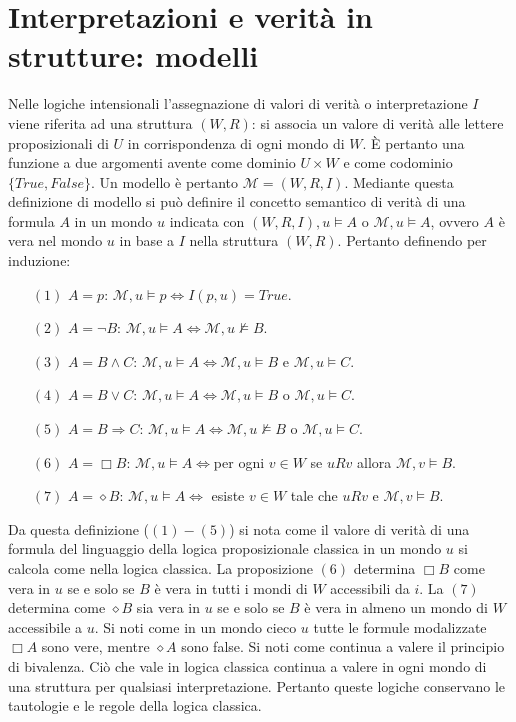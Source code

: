 \section{Interpretazioni e verit\`a in strutture: modelli}
Nelle logiche intensionali l'assegnazione di valori di verit\`a o interpretazione $I$ viene riferita ad una struttura $(W, R)$: si associa un valore di verit\`a alle lettere proposizionali di $U$ in corrispondenza di 
ogni mondo di $W$. \`E pertanto una funzione a due argomenti avente come dominio $U\times W$ e come codominio $\{True, False\}$. Un modello \`e pertanto $\mathcal{M}=(W, R, I)$. Mediante questa 
definizione di modello si pu\`o definire il concetto semantico di verit\`a di una formula $A$ in un mondo $u$ indicata con $(W, R, I), u\models A$ o $\mathcal{M}, u\models A$, ovvero $A$ \`e vera nel mondo 
$u$ in base a $I$ nella struttura $(W, R)$. Pertanto definendo per induzione: 
\begin{itemize}
\item[$(1)$] $A=p$: $\mathcal{M}, u\models p\Leftrightarrow I(p, u)=True$.
\item[$(2)$] $A=\neg B$: $\mathcal{M}, u\models A\Leftrightarrow \mathcal{M}, u\not\models B$.
\item[$(3)$] $A=B\land C$: $\mathcal{M}, u\models A\Leftrightarrow \mathcal{M}, u\models B$ e $\mathcal{M}, u\models C$.
\item[$(4)$] $A=B\lor C$: $\mathcal{M}, u\models A\Leftrightarrow \mathcal{M}, u\models B$ o $\mathcal{M}, u\models C$.
\item[$(5)$] $A=B\Rightarrow C$: $\mathcal{M}, u\models A\Leftrightarrow \mathcal{M}, u\not\models B$ o $\mathcal{M}, u\models C$.
\item[$(6)$] $A=\Box B$: $\mathcal{M}, u\models A\Leftrightarrow$per ogni $v\in W$ se $uRv$ allora $\mathcal{M}, v\models B$.
\item[$(7)$] $A=\diamond B$: $\mathcal{M}, u\models A\Leftrightarrow$ esiste $v\in W$ tale che $uRv$ e $\mathcal{M}, v\models B$.
\end{itemize}
Da questa definizione ($(1)-(5)$) si nota come il valore di verit\`a di una formula del linguaggio della logica proposizionale classica in un mondo $u$ si calcola come nella logica classica. La proposizione $(6)$
determina $\Box B$ come vera in $u$ se e solo se $B$ \`e vera in tutti i mondi di $W$ accessibili da $i$. La $(7)$ determina come $\diamond B$ sia vera in $u$ se e solo se $B$ \`e vera in almeno un mondo di 
$W$ accessibile a $u$. Si noti come in un mondo cieco $u$ tutte le formule modalizzate $\Box A$ sono vere, mentre $\diamond A$ sono false. Si noti come continua a valere il principio di bivalenza. Ci\`o che 
vale in logica classica continua  a valere in ogni mondo di una struttura per qualsiasi interpretazione. Pertanto queste logiche conservano le tautologie e le regole della logica classica. 

